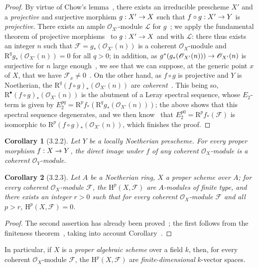 \documentclass[oneside]{amsart}
\theoremstyle{ega-env-style}
\theoremstyle{ega-thm-env-style}
\newtheorem*{corollary}{Corollary}
\theoremstyle{ega-defn-env-style}
\def\mathcal{\mathscr}
\def\sh{\mathcal}                   %
\def\HH{\mathrm{H}}                 %
\def\RR{\mathrm{R}}                 %
\renewcommand{\to}{\mathchoice{\longrightarrow}{\rightarrow}{\rightarrow}{\rightarrow}}
\let\EGAOriginalLabel\label
\renewcommand{\label}[1]{\phantomsection\EGAOriginalLabel{#1}}
\begin{document}
\begin{proof}
By virtue of Chow's lemma~, there exists an irreducible prescheme $X'$ and a \emph{projective} and surjective morphism $g:X'\to X$ such that $f\circ g:X'\to Y$ is \emph{projective}.
There exists an ample $\sh{O}_{X'}$-module $\sh{L}$ for $g$~; we apply the fundamental theorem of projective morphisms~ to $g:X'\to X$ and with $\sh{L}$: there thus exists an integer $n$ such that $\sh{F}=g_*(\sh{O}_{X'}(n))$ is a coherent $\sh{O}_X$-module and $\RR^q g_*(\sh{O}_{X'}(n))=0$ for all $q>0$; in addition, as $g^*(g_*(\sh{O}_{X'}(n)))\to\sh{O}_{X'}(n)$ is surjective for $n$ large enough~, we see that we can suppose, at the generic point $x$ of $X$, that we have $\sh{F}_x\neq 0$~.
On the other hand, as $f\circ g$ is projective and $Y$ is Noetherian, the $\RR^q(f\circ g)_*(\sh{O}_{X'}(n))$ are \emph{coherent}~.
This being so, $\RR^\bullet(f\circ g)_*(\sh{O}_{X'}(n))$ is the abutment of a Leray spectral sequence, whose $E_2$-term is given by $E_2^{pq}=\RR^p f_*(\RR^q g_*(\sh{O}_{X'}(n)))$; the above shows that this spectral sequence degenerates, and we then know~ that $E_2^{p0}=\RR^p f_*(\sh{F})$ is isomorphic to $\RR^p(f\circ g)_*(\sh{O}_{X'}(n))$, which finishes the proof.
\end{proof}

\begin{corollary}[3.2.2]
\label{III.3.2.2}
Let $Y$ be a locally Noetherian prescheme.
For every proper morphism $f:X\to Y$, the direct image under $f$ of any coherent $\sh{O}_X$-module is a coherent $\sh{O}_Y$-module.
\end{corollary}

\begin{corollary}[3.2.3]
\label{III.3.2.3}
Let $A$ be a Noetherian ring, $X$ a proper scheme over $A$; for every coherent $\sh{O}_X$-module $\sh{F}$, the $\HH^p(X,\sh{F})$ are $A$-modules of finite type, and there exists an integer $r>0$ such that for every coherent $\sh{O}_X$-module $\sh{F}$ and all $p>r$, $\HH^p(X,\sh{F})=0$.
\end{corollary}

\begin{proof}
The second assertion has already been proved~; the first follows from the finiteness theorem~, taking into account Corollary~.
\end{proof}

In particular, if $X$ is a \emph{proper algebraic scheme} over a field $k$, then, for every coherent $\sh{O}_X$-module $\sh{F}$, the $\HH^p(X,\sh{F})$ are \emph{finite-dimensional} $k$-vector spaces.
\end{document}
